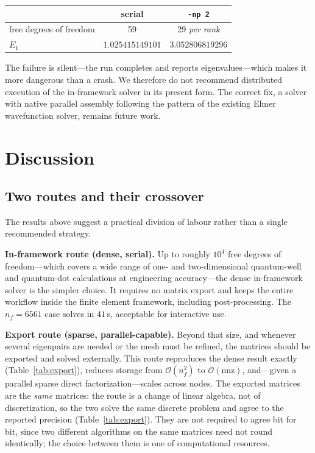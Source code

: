 \documentclass[pdflatex,sn-mathphys-num]{sn-jnl}
\theoremstyle{thmstyleone}%
\theoremstyle{thmstyletwo}%
\theoremstyle{thmstylethree}%
\begin{document}
\begin{center}
\begin{tabular}{@{}lcc@{}}
\toprule
 & serial & \texttt{-np 2} \\
\midrule
free degrees of freedom & 59 & 29 \emph{per rank} \\
$E_1$ & $1.025415149101$ & $3.052806819296$ \\
\bottomrule
\end{tabular}
\end{center}

\noindent
The failure is silent---the run completes and reports eigenvalues---which makes
it more dangerous than a crash. We therefore do not recommend distributed
execution of the in-framework solver in its present form. The correct fix, a
solver with native parallel assembly following the pattern of the existing
\textsf{Elmer} wavefunction solver, remains future work.

\section{Discussion}\label{sec:discussion}

\subsection{Two routes and their crossover}\label{sec:routes}

The results above suggest a practical division of labour rather than a single
recommended strategy.

\textbf{In-framework route (dense, serial).} Up to roughly $10^4$ free degrees of
freedom---which covers a wide range of one- and two-dimensional quantum-well and
quantum-dot calculations at engineering accuracy---the dense in-framework solver
is the simpler choice. It requires no matrix export and keeps the entire
workflow inside the finite element framework, including post-processing. The
$n_f = 6561$ case solves in $41$\,s, acceptable for interactive use.

\textbf{Export route (sparse, parallel-capable).} Beyond that size, and whenever
several eigenpairs are needed or the mesh must be refined, the matrices should
be exported and solved externally. This route reproduces the dense result
exactly (Table~\ref{tab:export}), reduces storage from $\mathcal{O}(n_f^2)$ to
$\mathcal{O}(\mathrm{nnz})$, and---given a parallel sparse direct
factorization---scales across nodes. The exported matrices are the \emph{same}
matrices: the route is a change of linear algebra, not of discretization, so the
two solve the same discrete problem and agree to the reported precision
(Table~\ref{tab:export}). They are not required to agree bit for bit, since two
different algorithms on the same matrices need not round identically; the choice
between them is one of computational resources.
\end{document}
